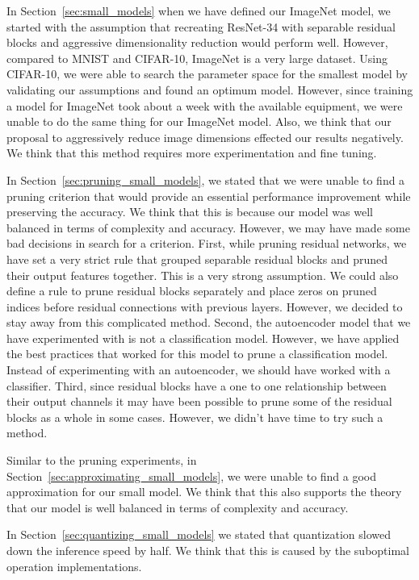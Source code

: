 In Section~\ref{sec:small_models} when we have defined our ImageNet model, we started with the assumption that recreating ResNet-34 with separable residual blocks and aggressive dimensionality reduction would perform well. However, compared to MNIST and CIFAR-10, ImageNet is a very large dataset. Using CIFAR-10, we were able to search the parameter space for the smallest model by validating our assumptions and found an optimum model. However, since training a model for ImageNet took about a week with the available equipment, we were unable to do the same thing for our ImageNet model. Also, we think that our proposal to aggressively reduce image dimensions effected our results negatively. We think that this method requires more experimentation and fine tuning.

In Section~\ref{sec:pruning_small_models}, we stated that we were unable to find a pruning criterion that would provide an essential performance improvement while preserving the accuracy. We think that this is because our model was well balanced in terms of complexity and accuracy. However, we may have made some bad decisions in search for a criterion. First, while pruning residual networks, we have set a very strict rule that grouped separable residual blocks and pruned their output features together. This is a very strong assumption. We could also define a rule to prune residual blocks separately and place zeros on pruned indices before residual connections with previous layers. However, we decided to stay away from this complicated method. Second, the autoencoder model that we have experimented with is not a classification model. However, we have applied the best practices that worked for this model to prune a classification model. Instead of experimenting with an autoencoder, we should have worked with a classifier. Third, since residual blocks have a one to one relationship between their output channels it may have been possible to prune some of the residual blocks as a whole in some cases. However, we didn't have time to try such a method. 

Similar to the pruning experiments, in Section~\ref{sec:approximating_small_models}, we were unable to find a good approximation for our small model. We think that this also supports the theory that our model is well balanced in terms of complexity and accuracy.

In Section~\ref{sec:quantizing_small_models} we stated that quantization slowed down the inference speed by half. We think that this is caused by the suboptimal operation implementations. 


